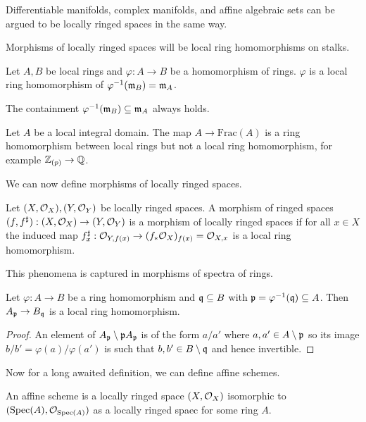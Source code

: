 \begin{remark}
    Differentiable manifolds, complex manifolds, and affine algebraic sets can be argued to be locally ringed spaces in the same way. 
\end{remark}
Morphisms of locally ringed spaces will be local ring homomorphisms on stalks. 
\begin{definition}\label{def: local ring homomorphism}
    Let $A,B$ be local rings and $\varphi:A\to B$ be a homomorphism of rings. $\varphi$ is a local ring homomorphism of $\varphi^{-1}(\mathfrak{m}_{B})=\mathfrak{m}_{A}$. 
\end{definition}
\begin{remark}
    The containment $\varphi^{-1}(\mathfrak{m}_{B})\subseteq\mathfrak{m}_{A}$ always holds. 
\end{remark}
\begin{example}
    Let $A$ be a local integral domain. The map $A\to\mathrm{Frac}(A)$ is a ring homomorphism between local rings but not a local ring homomorphism, for example $\mathbb{Z}_{(p)}\to\mathbb{Q}$.
\end{example}
We can now define morphisms of locally ringed spaces. 
\begin{definition}\label{def: morphism of locally ringed spaces}
    Let $(X,\mathcal{O}_{X}),(Y,\mathcal{O}_{Y})$ be locally ringed spaces. A morphism of ringed spaces $(f,f^{\sharp}):(X,\mathcal{O}_{X})\to (Y,\mathcal{O}_{Y})$ is a morphism of locally ringed spaces if for all $x\in X$ the induced map $f^{\sharp}_{x}:\mathcal{O}_{Y,f(x)}\to (f_{*}\mathcal{O}_{X})_{f(x)}=\mathcal{O}_{X,x}$ is a local ring homomorphism. 
\end{definition}
This phenomena is captured in morphisms of spectra of rings. 
\begin{proposition}\label{prop: morphism of rings induces morphism of local rings}
    Let $\varphi:A\to B$ be a ring homomorphism and $\mathfrak{q}\subseteq B$ with $\mathfrak{p}=\varphi^{-1}(\mathfrak{q})\subseteq A$. Then $A_{\mathfrak{p}}\to B_{\mathfrak{q}}$ is a local ring homomorphism. 
\end{proposition}
\begin{proof}
    An element of $A_{\mathfrak{p}}\setminus \mathfrak{p} A_{\mathfrak{p}}$ is of the form $a/a'$ where $a,a'\in A\setminus\mathfrak{p}$ so its image $b/b'=\varphi(a)/\varphi(a')$ is such that $b,b'\in B\setminus\mathfrak{q}$ and hence invertible. 
\end{proof}
Now for a long awaited definition, we can define affine schemes. 
\begin{definition}\label{def: affine scheme}
    An affine scheme is a locally ringed space $(X,\mathcal{O}_{X})$ isomorphic to $(\operatorname{Spec}(A),\mathcal{O}_{\operatorname{Spec}(A)})$ as a locally ringed spaec for some ring $A$.  
\end{definition}
